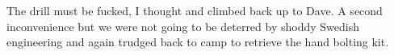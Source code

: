 The drill must be fucked, I thought and climbed back up to Dave. A second inconvenience but we were not going to be deterred by shoddy Swedish engineering and again trudged back to camp to retrieve the hand bolting kit. 

\begin{pagefigure}
\centering
\begin{subfigure}[t]{0.49\textwidth}
\caption{}
\end{subfigure}
\hspace{2pt}
\begin{subfigure}[t]{0.49\textwidth}

\end{subfigure}
\end{pagefigure}
